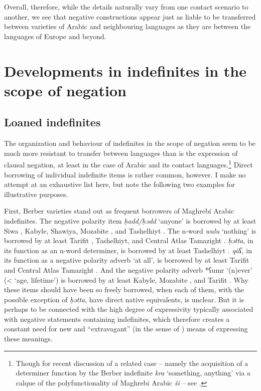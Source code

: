\documentclass[output=paper]{langsci/langscibook}
\begin{document}
Overall, therefore, while the details naturally vary from one contact scenario to another, we see that negative constructions appear just as liable to be transferred between varieties of Arabic and neighbouring languages as they are between the languages of Europe and beyond.


\section{Developments in indefinites in the scope of negation}\label{sec:sco}


\subsection{Loaned indefinites}


The organization and behaviour of indefinites in the scope of negation seem to be much more resistant to transfer between languages than is the expression of clausal negation, at least in the case of Arabic and its contact languages.\footnote{Though for recent discussion of a related case – namely the acquisition of a determiner function by the Berber indefinite \textit{kra} ‘something, anything’ via a calque of the polyfunctionality of Maghrebi Arabic \textit{ši\-} – see \citet{Souag2018berber}.} Direct borrowing of individual indefinite items is rather common, however. I make no attempt at an exhaustive list here, but note the following two examples for illustrative purposes. 

First, Berber varieties stand out as frequent borrowers of Maghrebi Arabic indefinites. The negative polarity item \textit{ḥadd/ḥədd} ‘anyone’ is borrowed by at least Siwa \citep[58]{Souag2009}, Kabyle, Shawiya, Mozabite \citep[29]{Rabhi1996}, and Tashelhiyt \citep[41]{Boumalk1996}. The n-word \textit{walu} ‘nothing’ is borrowed by at least Tarifit \citep[54]{Lafkioui1996}, Tashelhiyt, and Central Atlas Tamazight \citep[41]{Boumalk1996}. \textit{ḥətta}, in its function as an n-word determiner, is borrowed by at least Tashelhiyt \citep[41]{Boumalk1996}. \textit{qāʕ}, in its function as a negative polarity adverb ‘at all’, is borrowed by at least Tarifit and Central Atlas Tamazight \citep[42]{Boumalk1996}. And the negative polarity adverb *ʕumr ‘(n)ever’ (< ‘age, lifetime’) is borrowed by at least Kabyle, Mozabite \citep[30]{Rabhi1996}, and Tarifit \citep[72]{Lafkioui1996}. Why these items should have been so freely borrowed, when each of them, with the possible exception of \textit{ḥətta}, have direct native equivalents, is unclear. But it is perhaps to be connected with the high degree of expressivity typically associated with negative statements containing indefinites, which therefore creates a constant need for new and “extravagant” (in the sense of \citealt{Haspelmath2000}) means of expressing these meanings.
\end{document}
